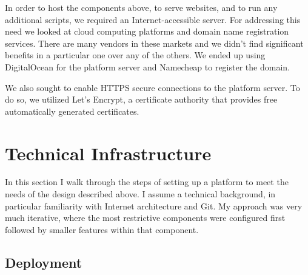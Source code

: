 \documentclass[12pt,twoside]{mitthesis}
\newcommand{\draft}[1]{{\color{blue} #1}}
\begin{document}
\draft{In order to host the components above, to serve websites, and to run any additional scripts, we required an Internet-accessible server. For addressing this need we looked at cloud computing platforms and domain name registration services. There are many vendors in these markets and we didn't find significant benefits in a particular one over any of the others. We ended up using DigitalOcean for the platform server and Namecheap to register the domain.

We also sought to enable HTTPS secure connections to the platform server. To do so, we utilized Let's Encrypt, a certificate authority that provides free automatically generated certificates.}

\section{Technical Infrastructure}

\draft{In this section I walk through the steps of setting up a platform to meet the needs of the design described above. I assume a technical background, in particular familiarity with Internet architecture and Git. My approach was very much iterative, where the most restrictive components were configured first followed by smaller features within that component.}

\subsection{Deployment}
\end{document}
